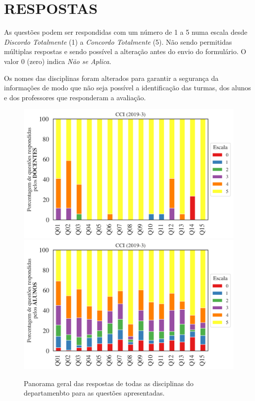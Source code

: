 \documentclass[a4paper,10pt]{article}
\begin{document}
\section{RESPOSTAS}
As questões podem ser respondidas com um número de 1 a 5 numa escala desde {\it Discordo Totalmente} (1) a {\it Concordo Totalmente} (5). Não sendo permitidas múltiplas respostas e sendo possível a alteração antes do envio do formulário. O valor 0 (zero) indica {\it Não se Aplica}.

Os nomes das disciplinas foram alterados para garantir a segurança da informações de modo que não seja possível a identificação das turmas, dos alunos  e dos professores que responderam a avaliação.

\begin{figure}[h]
\centering
\includegraphics[width=0.85\linewidth]{analise_geral_departamento_CCI_docentes.png}
\includegraphics[width=0.85\linewidth]{analise_geral_departamento_CCI_alunos.png}
\caption{\label{fig:analise_geral_departamento}            Panorama geral das respostas de todas as  disciplinas do departamenbto para as questões apresentadas.}
\end{figure}
\end{document}
